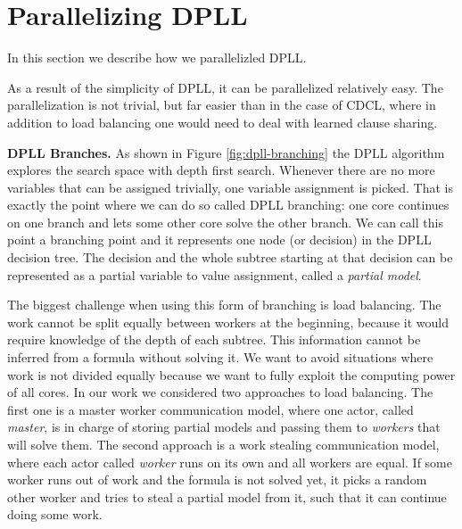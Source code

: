 \documentclass[letterpaper]{article}
\newcommand{\mypar}[1]{{\bf #1.}}
\begin{document}
\section{Parallelizing DPLL}\label{sec:parallel_dpll}
In this section we describe how we parallelizled DPLL.

As a result of the simplicity of DPLL, it can be parallelized relatively easy.
The parallelization is not trivial, but far easier than in the case of CDCL, where in addition to load balancing one would need to deal with learned clause sharing.

\mypar{DPLL Branches}
As shown in Figure \ref{fig:dpll-branching} the DPLL algorithm explores the search space with depth first search.
Whenever there are no more variables that can be assigned trivially, one variable assignment is picked.
That is exactly the point where we can do so called DPLL branching: one core continues on one branch and lets some other core solve the other branch.
We can call this point a branching point and it represents one node (or decision) in the DPLL decision tree.
The decision and the whole subtree starting at that decision can be represented as a partial variable to value assignment, called a \textit{partial model}.

The biggest challenge when using this form of branching is load balancing.
The work cannot be split equally between workers at the beginning, because it would require knowledge of the depth of each subtree.
This information cannot be inferred from a formula without solving it.
We want to avoid situations where work is not divided equally because we want to fully exploit the computing power of all cores.
In our work we considered two approaches to load balancing.
The first one is a master worker communication model, where one actor, called \textit{master}, is in charge of storing partial models and passing them to \textit{workers} that will solve them.
The second approach is a work stealing communication model, where each actor called \textit{worker} runs on its own and all workers are equal.
If some worker runs out of work and the formula is not solved yet, it picks a random other worker and tries to steal a partial model from it, such that it can continue doing some work.
\end{document}
